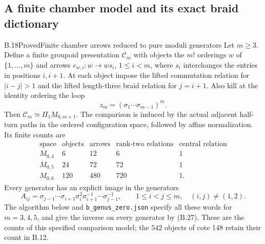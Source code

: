 \subsection{A finite chamber model and its exact braid dictionary}

\begin{result}{B.18}{Proved}{Finite chamber arrows reduced to pure moduli generators}
Let $m\geq3$.  Define a finite groupoid presentation $\mathcal C_m$
with objects the $m!$ orderings $w$ of $\{1,\ldots,m\}$ and arrows
$e_{w,i}:w\to ws_i$, $1\leq i<m$, where $s_i$ interchanges the
entries in positions $i,i+1$.  At each object impose the lifted
commutation relation for $|i-j|>1$ and the lifted length-three
braid relation for $j=i+1$.  Also kill at the identity ordering
the loop
\[
 z_m=(\sigma_1\cdots\sigma_{m-1})^m.                 \tag{B.25}
\]
Then $\mathcal C_m\simeq\Pi_1M_{0,m+1}$.  The comparison is induced
by the actual adjacent half-turn paths in the ordered configuration
space, followed by affine normalization.  Its finite counts are
\[
\begin{array}{c|r|r|r|r}
 \text{space}&\text{objects}&\text{arrows}&
 \text{rank-two relations}&\text{central relation}\\\hline
 M_{0,4}&6&12&6&1\\
 M_{0,5}&24&72&72&1\\
 M_{0,6}&120&480&720&1.
\end{array}                                                   \tag{B.26}
\]
Every generator has an explicit image in the generators
\[
 A_{ij}=\sigma_{j-1}\cdots\sigma_{i+1}\sigma_i^2
             \sigma_{i+1}^{-1}\cdots\sigma_{j-1}^{-1},
 \qquad 1\leq i<j\leq m,\quad (i,j)\ne(1,2).       \tag{B.27}
\]
The algorithm below and \texttt{b\_genus\_zero.json} specify all
these words for $m=3,4,5$, and give the inverse on every generator
by (B.27).  These are the counts of this specified comparison
model; the $542$ objects of cote 148 retain their count in B.12.
\end{result}
